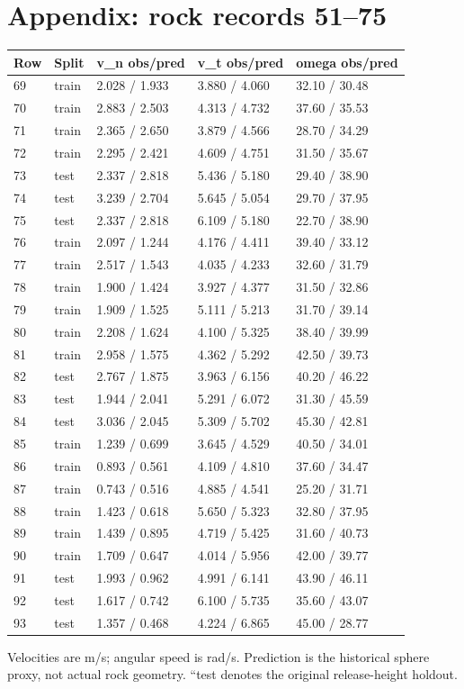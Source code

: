 \documentclass[10pt,a4paper]{article}
\begin{document}
\section*{Appendix: rock records 51--75}
\begin{center}\footnotesize\setlength{\tabcolsep}{4pt}
\begin{tabular}{lllll}
\hline
Row & Split & v\_n obs/pred & v\_t obs/pred & omega obs/pred\\\hline
69 & train & 2.028 / 1.933 & 3.880 / 4.060 & 32.10 / 30.48\\
70 & train & 2.883 / 2.503 & 4.313 / 4.732 & 37.60 / 35.53\\
71 & train & 2.365 / 2.650 & 3.879 / 4.566 & 28.70 / 34.29\\
72 & train & 2.295 / 2.421 & 4.609 / 4.751 & 31.50 / 35.67\\
73 & test & 2.337 / 2.818 & 5.436 / 5.180 & 29.40 / 38.90\\
74 & test & 3.239 / 2.704 & 5.645 / 5.054 & 29.70 / 37.95\\
75 & test & 2.337 / 2.818 & 6.109 / 5.180 & 22.70 / 38.90\\
76 & train & 2.097 / 1.244 & 4.176 / 4.411 & 39.40 / 33.12\\
77 & train & 2.517 / 1.543 & 4.035 / 4.233 & 32.60 / 31.79\\
78 & train & 1.900 / 1.424 & 3.927 / 4.377 & 31.50 / 32.86\\
79 & train & 1.909 / 1.525 & 5.111 / 5.213 & 31.70 / 39.14\\
80 & train & 2.208 / 1.624 & 4.100 / 5.325 & 38.40 / 39.99\\
81 & train & 2.958 / 1.575 & 4.362 / 5.292 & 42.50 / 39.73\\
82 & test & 2.767 / 1.875 & 3.963 / 6.156 & 40.20 / 46.22\\
83 & test & 1.944 / 2.041 & 5.291 / 6.072 & 31.30 / 45.59\\
84 & test & 3.036 / 2.045 & 5.309 / 5.702 & 45.30 / 42.81\\
85 & train & 1.239 / 0.699 & 3.645 / 4.529 & 40.50 / 34.01\\
86 & train & 0.893 / 0.561 & 4.109 / 4.810 & 37.60 / 34.47\\
87 & train & 0.743 / 0.516 & 4.885 / 4.541 & 25.20 / 31.71\\
88 & train & 1.423 / 0.618 & 5.650 / 5.323 & 32.80 / 37.95\\
89 & train & 1.439 / 0.895 & 4.719 / 5.425 & 31.60 / 40.73\\
90 & train & 1.709 / 0.647 & 4.014 / 5.956 & 42.00 / 39.77\\
91 & test & 1.993 / 0.962 & 4.991 / 6.141 & 43.90 / 46.11\\
92 & test & 1.617 / 0.742 & 6.100 / 5.735 & 35.60 / 43.07\\
93 & test & 1.357 / 0.468 & 4.224 / 6.865 & 45.00 / 28.77\\
\hline\end{tabular}\end{center}Velocities are m/s; angular speed is rad/s. Prediction is the historical sphere proxy, not actual rock geometry. ``test denotes the original release-height holdout.
\newpage
\end{document}
